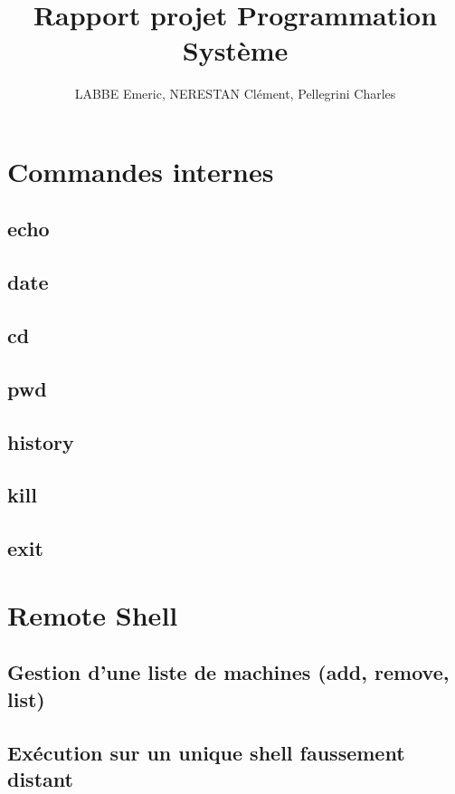 \documentclass[12pt]{article}
\author{LABBE Emeric, NERESTAN Clément, Pellegrini Charles}
\title{Rapport projet Programmation Système}
\begin{document}
\maketitle
\tableofcontents

\newpage
\section{Commandes internes}
\subsection{echo}

\subsection{date}

\subsection{cd}

\subsection{pwd}

\subsection{history}

\subsection{kill}

\subsection{exit}

\newpage
\section{Remote Shell}
\subsection{Gestion d'une liste de machines (add, remove, list)}

\subsection{Exécution sur un unique shell faussement distant}
\end{document}
